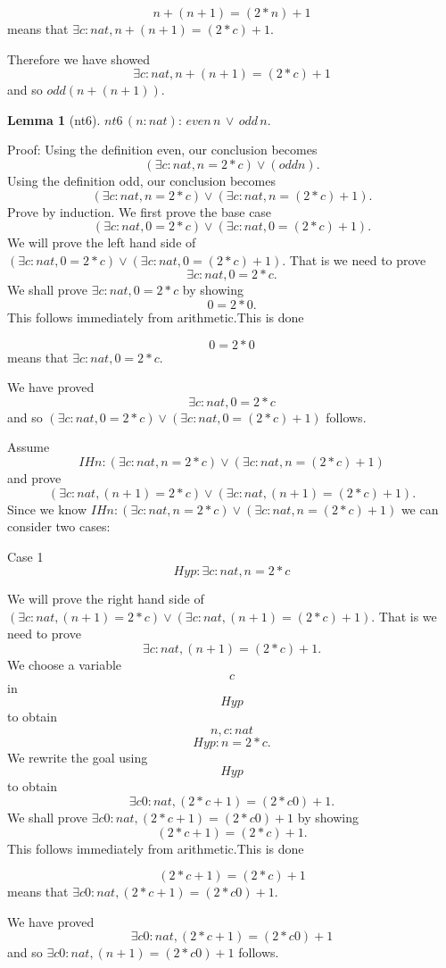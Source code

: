 \documentclass[11pt, oneside]{article}
\newtheorem{Lemma}{Lemma}
\begin{document}
 $$n + (n + 1) = (2 * n) + 1 $$ means that $\exists c : nat, n + (n + 1) = (2 * c) + 1 $.

 Therefore we have showed $$\exists c : nat, n + (n + 1) = (2 * c) + 1 $$ and so $odd (n + (n + 1)) $.\begin{Lemma}[nt6] \label{Lemma:nt6}
$nt6\,(n:nat):\,even\,n\,\lor \,odd\,n.$
 \end{Lemma}


 Proof: Using the definition even, our conclusion becomes $$(\exists c : nat, n = 2 * c) \lor (odd n) .$$Using the definition odd, our conclusion becomes $$(\exists c : nat, n = 2 * c) \lor (\exists c : nat, n = (2 * c) + 1) .$$Prove by induction. We first prove the base case $$(\exists c : nat, 0 = 2 * c) \lor (\exists c : nat, 0 = (2 * c) + 1) .$$We will prove the left hand side of $(\exists c : nat, 0 = 2 * c) \lor (\exists c : nat, 0 = (2 * c) + 1) $. That is we need to prove $$\exists c : nat, 0 = 2 * c .$$ We shall prove $\exists c : nat, 0 = 2 * c $ by showing $$0 = 2 * 0 .$$This follows immediately from arithmetic.This is done

 $$0 = 2 * 0 $$ means that $\exists c : nat, 0 = 2 * c $.

 We have proved $$\exists c : nat, 0 = 2 * c $$ and so $(\exists c : nat, 0 = 2 * c) \lor (\exists c : nat, 0 = (2 * c) + 1) $ follows.

 Assume $$IHn : (\exists c : nat, n = 2 * c) \lor (\exists c : nat, n = (2 * c) + 1) $$ and prove $$(\exists c : nat, (n + 1) = 2 * c) \lor (\exists c : nat, (n + 1) = (2 * c) + 1) .$$ Since we know $IHn : (\exists c : nat, n = 2 * c) \lor (\exists c : nat, n = (2 * c) + 1) $ we can consider two cases: 

 Case 1 $$Hyp : \exists c : nat, n = 2 * c $$

 We will prove the right hand side of $(\exists c : nat, (n + 1) = 2 * c) \lor (\exists c : nat, (n + 1) = (2 * c) + 1) $. That is we need to prove $$\exists c : nat, (n + 1) = (2 * c) + 1 .$$ We choose a variable $$c$$ in $$Hyp $$ to obtain $$n, c : nat $$ $$Hyp : n = 2 * c .$$ We rewrite the goal using $$Hyp $$ to obtain $$\exists c0 : nat, (2 * c + 1) = (2 * c0) + 1 .$$We shall prove $\exists c0 : nat, (2 * c + 1) = (2 * c0) + 1 $ by showing $$(2 * c + 1) = (2 * c) + 1 .$$This follows immediately from arithmetic.This is done

 $$(2 * c + 1) = (2 * c) + 1 $$ means that $\exists c0 : nat, (2 * c + 1) = (2 * c0) + 1 $.

 We have proved $$\exists c0 : nat, (2 * c + 1) = (2 * c0) + 1 $$ and so $\exists c0 : nat, (n + 1) = (2 * c0) + 1 $ follows.
\end{document}

